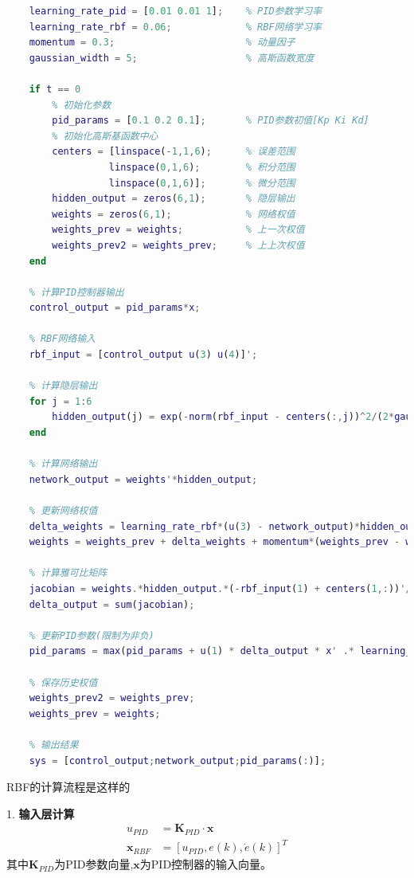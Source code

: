 \documentclass[12pt,a4paper,UTF8]{article}
\begin{document}
\begin{lstlisting}[language=Matlab,caption=RBF神经网络控制器实现]
    % 学习参数设置
    learning_rate_pid = [0.01 0.01 1];    % PID参数学习率
    learning_rate_rbf = 0.06;             % RBF网络学习率
    momentum = 0.3;                       % 动量因子
    gaussian_width = 5;                   % 高斯函数宽度
    
    if t == 0
        % 初始化参数
        pid_params = [0.1 0.2 0.1];       % PID参数初值[Kp Ki Kd]
        % 初始化高斯基函数中心
        centers = [linspace(-1,1,6);      % 误差范围
                  linspace(0,1,6);        % 积分范围
                  linspace(0,1,6)];       % 微分范围
        hidden_output = zeros(6,1);       % 隐层输出
        weights = zeros(6,1);             % 网络权值
        weights_prev = weights;           % 上一次权值
        weights_prev2 = weights_prev;     % 上上次权值
    end

    % 计算PID控制器输出
    control_output = pid_params*x;
    
    % RBF网络输入
    rbf_input = [control_output u(3) u(4)]';

    % 计算隐层输出
    for j = 1:6
        hidden_output(j) = exp(-norm(rbf_input - centers(:,j))^2/(2*gaussian_width^2));
    end
    
    % 计算网络输出
    network_output = weights'*hidden_output;
    
    % 更新网络权值
    delta_weights = learning_rate_rbf*(u(3) - network_output)*hidden_output;
    weights = weights_prev + delta_weights + momentum*(weights_prev - weights_prev2);

    % 计算雅可比矩阵
    jacobian = weights.*hidden_output.*(-rbf_input(1) + centers(1,:))'/gaussian_width^2;   
    delta_output = sum(jacobian);
    
    % 更新PID参数(限制为非负)
    pid_params = max(pid_params + u(1) * delta_output * x' .* learning_rate_pid, 0);
    
    % 保存历史权值
    weights_prev2 = weights_prev;
    weights_prev = weights;
    
    % 输出结果
    sys = [control_output;network_output;pid_params(:)];
\end{lstlisting}

RBF的计算流程是这样的

1. \textbf{输入层计算}
   \begin{equation}
   \begin{aligned}
   u_{PID} &= \mathbf{K}_{PID} \cdot \mathbf{x} \\
   \mathbf{x}_{RBF} &= [u_{PID}, e(k), \dot{e}(k)]^T
   \end{aligned}
   \end{equation}
   其中$\mathbf{K}_{PID}$为PID参数向量,$\mathbf{x}$为PID控制器的输入向量。
\end{document}

